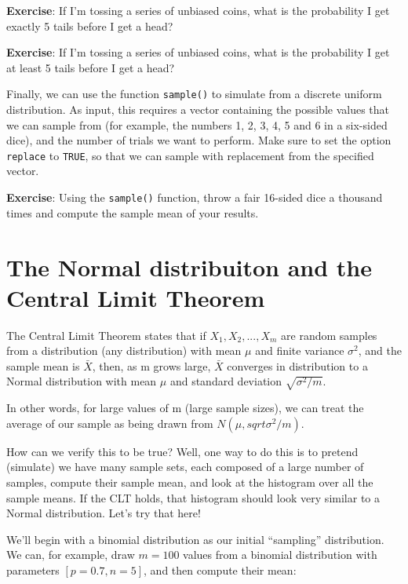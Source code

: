 \documentclass[
]{book}
\begin{document}
\textbf{Exercise}: If I'm tossing a series of unbiased coins, what is the probability I get exactly 5 tails before I get a head?

\textbf{Exercise}: If I'm tossing a series of unbiased coins, what is the probability I get at least 5 tails before I get a head?

Finally, we can use the function \texttt{sample()} to simulate from a discrete uniform distribution. As input, this requires a vector containing the possible values that we can sample from (for example, the numbers 1, 2, 3, 4, 5 and 6 in a six-sided dice), and the number of trials we want to perform. Make sure to set the option \texttt{replace} to \texttt{TRUE}, so that we can sample with replacement from the specified vector.

\textbf{Exercise}: Using the \texttt{sample()} function, throw a fair 16-sided dice a thousand times and compute the sample mean of your results.

\hypertarget{the-normal-distribuiton-and-the-central-limit-theorem}{%
\section{The Normal distribuiton and the Central Limit Theorem}\label{the-normal-distribuiton-and-the-central-limit-theorem}}

The Central Limit Theorem states that if \(X_1, X_2, ..., X_m\) are random samples from a distribution (any distribution) with mean \(\mu\) and finite variance \(\sigma^2\), and the sample mean is \(\bar{X}\), then, as m grows large, \(\bar{X}\) converges in distribution to a Normal distribution with mean \(\mu\) and standard deviation \(\sqrt{\sigma^2 /m}\).

In other words, for large values of m (large sample sizes), we can treat the average of our sample as being drawn from \(N(\mu,sqrt{\sigma^2/m})\).

How can we verify this to be true? Well, one way to do this is to pretend (simulate) we have many sample sets, each composed of a large number of samples, compute their sample mean, and look at the histogram over all the sample means. If the CLT holds, that histogram should look very similar to a Normal distribution. Let's try that here!

We'll begin with a binomial distribution as our initial ``sampling'' distribution. We can, for example, draw \(m=100\) values from a binomial distribution with parameters \([p=0.7,n=5]\), and then compute their mean:
\end{document}
